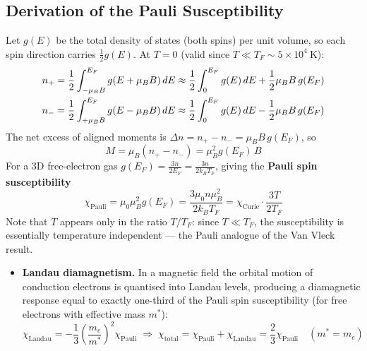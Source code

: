 \documentclass[11pt,a4paper]{article}
\begin{document}
\subsection{Derivation of the Pauli Susceptibility}

Let $g(E)$ be the total density of states (both spins) per unit volume, so each spin direction carries $\frac{1}{2}g(E)$. At $T = 0$ (valid since $T\ll T_F\sim5\times10^{4}\ \mathrm{K}$):
\begin{align}
    n_+ &= \frac{1}{2}\int_{-\mu_BB}^{E_F}g(E+\mu_BB)\,dE
        \approx \frac{1}{2}\int_0^{E_F}g(E)\,dE + \frac{1}{2}\mu_BB\,g(E_F) \notag\\
    n_- &= \frac{1}{2}\int_{+\mu_BB}^{E_F}g(E-\mu_BB)\,dE
        \approx \frac{1}{2}\int_0^{E_F}g(E)\,dE - \frac{1}{2}\mu_BB\,g(E_F)
    \label{eq:paulinplus}
\end{align}
The net excess of aligned moments is $\Delta n = n_+ - n_- = \mu_BB\,g(E_F)$, so
\begin{equation}
    M = \mu_B(n_+ - n_-) = \mu_B^2g(E_F)\,B
    \label{eq:paulimag}
\end{equation}
For a 3D free-electron gas $g(E_F) = \frac{3n}{2E_F} = \frac{3n}{2k_BT_F}$, giving the \textbf{Pauli spin susceptibility}
\begin{equation}
    \boxed{\;\chi_{\mathrm{Pauli}} = \mu_0\mu_B^2g(E_F)
    = \frac{3\mu_0n\mu_B^2}{2k_BT_F}
    = \chi_{\mathrm{Curie}}\cdot\frac{3T}{2T_F}\;}
    \label{eq:pauli}
\end{equation}
Note that $T$ appears only in the ratio $T/T_F$: since $T\ll T_F$, the susceptibility is essentially temperature independent --- the Pauli analogue of the Van Vleck result.

\begin{itemize}[leftmargin=1.6cm]
    \item \textbf{Landau diamagnetism.} In a magnetic field the orbital motion of conduction electrons is quantised into Landau levels, producing a diamagnetic response equal to exactly one-third of the Pauli spin susceptibility (for free electrons with effective mass $m^*$):
    \begin{equation}
        \chi_{\mathrm{Landau}} = -\frac{1}{3}\left(\frac{m_e}{m^*}\right)^2\chi_{\mathrm{Pauli}}
        \;\Longrightarrow\;
        \chi_{\mathrm{total}} = \chi_{\mathrm{Pauli}} + \chi_{\mathrm{Landau}}
        = \frac{2}{3}\chi_{\mathrm{Pauli}}\quad (m^* = m_e)
        \label{eq:landau}
    \end{equation}
\end{itemize}
\end{document}
